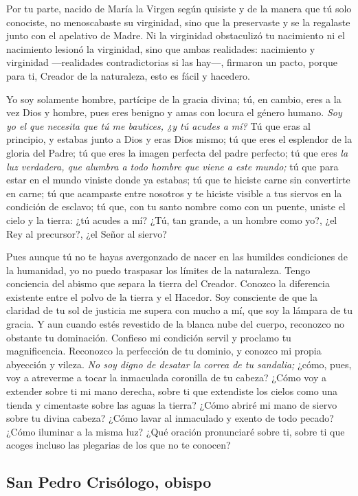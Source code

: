 {Por tu parte, nacido de María la Virgen según quisiste y de la manera que tú solo conociste, no menoscabaste su virginidad, sino que la preservaste y se la regalaste junto con el apelativo de Madre. Ni la virginidad obstaculizó tu nacimiento ni el nacimiento lesionó la virginidad, sino que ambas realidades: nacimiento y virginidad ---realidades contradictorias si las hay---, firmaron un pacto, porque para ti, Creador de la naturaleza, esto es fácil y hacedero.

Yo soy solamente hombre, partícipe de la gracia divina; tú, en cambio, eres a la vez Dios y hombre, pues eres benigno y amas con locura el género humano. \emph{Soy yo el que necesita que tú me bautices, ¿y tú acudes a mí?} Tú que eras al principio, y estabas junto a Dios y eras Dios mismo; tú que eres el esplendor de la gloria del Padre; tú que eres la imagen perfecta del padre perfecto; tú que eres \emph{la luz verdadera, que alumbra a todo hombre que viene a este mundo;} tú que para estar en el mundo viniste donde ya estabas; tú que te hiciste carne sin convertirte en carne; tú que acampaste entre nosotros y te hiciste visible a tus siervos en la condición de esclavo; tú que, con tu santo nombre como con un puente, uniste el cielo y la tierra: ¿tú acudes a mí? ¿Tú, tan grande, a un hombre como yo?, ¿el Rey al precursor?, ¿el Señor al siervo?

Pues aunque tú no te hayas avergonzado de nacer en las humildes condiciones de la humanidad, yo no puedo traspasar los límites de la naturaleza. Tengo conciencia del abismo que separa la tierra del Creador. Conozco la diferencia existente entre el polvo de la tierra y el Hacedor. Soy consciente de que la claridad de tu sol de justicia me supera con mucho a mí, que soy la lámpara de tu gracia. Y aun cuando estés revestido de la blanca nube del cuerpo, reconozco no obstante tu dominación. Confieso mi condición servil y proclamo tu magnificencia. Reconozco la perfección de tu dominio, y conozco mi propia abyección y vileza. \emph{No soy digno de desatar la correa de tu sandalia;} ¿cómo, pues, voy a atreverme a tocar la inmaculada coronilla de tu cabeza? ¿Cómo voy a extender sobre ti mi mano derecha, sobre ti que extendiste los cielos como una tienda y cimentaste sobre las aguas la tierra? ¿Cómo abriré mi mano de siervo sobre tu divina cabeza? ¿Cómo lavar al inmaculado y exento de todo pecado? ¿Cómo iluminar a la misma luz? ¿Qué oración pronunciaré sobre ti, sobre ti que acoges incluso las plegarias de los que no te conocen?

\subsection{San Pedro Crisólogo, obispo}

}

